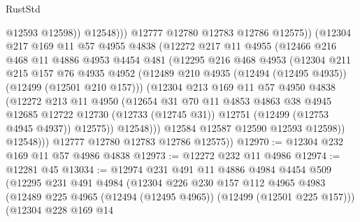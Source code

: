 \begin{lexlean}{RustStd}
\begin{coremodule}
{\begin{coremodule}
{{{{{{{{{{{{{{{{{{{{{{{{{{{{{{{{{{{{{{{{{{{{{{{{{{{{{{{{{{{{{{{{{{{{{{{{{{{{{{{{                          @12593
                          @12598))
                      @12548)))
                @12777
                @12780
                @12783
                @12786
                @12575))
            (@12304
              @217
              @169
              @11
              @57
              @4955
              @4838
              (@12272
                @217
                @11
                @4955
                (@12466
                  @216
                  @468
                  @11
                  @4886
                  @4953
                  @4454
                  @481
                  (@12295
                    @216
                    @468
                    @4953
                    (@12304
                      @211
                      @215
                      @157
                      @76
                      @4935
                      @4952
                      (@12489 @210 @4935 (@12494 (@12495 @4935)) (@12499 (@12501 @210 @157)))
                      (@12304
                        @213
                        @169
                        @11
                        @57
                        @4950
                        @4838
                        (@12272
                          @213
                          @11
                          @4950
                          (@12654
                            @31
                            @70
                            @11
                            @4853
                            @4863
                            @38
                            @4945
                            @12685
                            @12722
                            @12730
                            (@12733 (@12745 @31))
                            @12751
                            (@12499 (@12753 @4945 @4937))
                            @12575))
                        @12548)))
                  @12584
                  @12587
                  @12590
                  @12593
                  @12598))
              @12548)))
        @12777
        @12780
        @12783
        @12786
        @12575))
@12970 := @12304 @232 @169 @11 @57 @4986 @4838
@12973 := @12272 @232 @11 @4986
@12974 := @12281 @45
@13034 := @12974
    @231
    @491
    @11
    @4886
    @4984
    @4454
    @509
    (@12295
      @231
      @491
      @4984
      (@12304
        @226
        @230
        @157
        @112
        @4965
        @4983
        (@12489 @225 @4965 (@12494 (@12495 @4965)) (@12499 (@12501 @225 @157)))
        (@12304
          @228
          @169
          @14
}}}}}}}}}}}}}}}}}}}}}}}}}}}}}}}}}}}}}}}}}}}}}}}}}}}}}}}}}}}}}}}}}}}}}}}}}}}}}}}}
\end{coremodule}}
\end{coremodule}
\end{lexlean}
